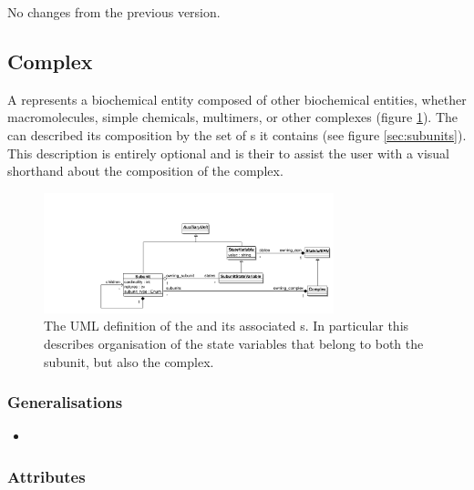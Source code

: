 No changes from the previous version.


\subsection{Complex}\label{sec:complex}
\label{defn:Complex}

A  represents a biochemical entity composed of
other biochemical entities, whether macromolecules, simple chemicals,
multimers, or other complexes (figure
\ref{fig:complexsubunituml}). The  can described
its composition by the set of s it contains (see
figure \ref{sec:subunits}). This description is entirely optional and
is their to assist the user with a visual shorthand about the
composition of the complex.

\begin{figure}[htb]
  \centering
  \includegraphics[width = 0.75\textwidth]{images/complexsubunituml}
  \caption{The UML definition of the  and its
    associated s. In particular this describes organisation
   of the state variables that belong to both the subunit, but also
   the complex.}
  \label{fig:complexsubunituml}
\end{figure}

\subsubsection{Generalisations}

\begin{itemize}
\item {} 
\end{itemize}

\subsubsection{Attributes}

